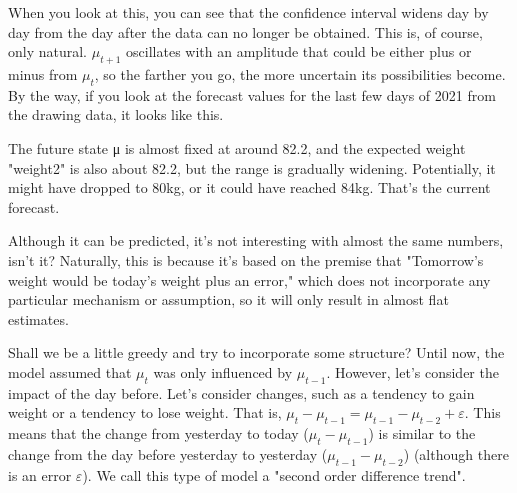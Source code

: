 \documentclass{ltjsbook}
\begin{document}
When you look at this, you can see that the confidence interval widens day by day from the day after the data can no longer be obtained. This is, of course, only natural. $\mu_{t+1}$ oscillates with an amplitude that could be either plus or minus from $\mu_t$, so the farther you go, the more uncertain its possibilities become. By the way, if you look at the forecast values for the last few days of 2021 from the drawing data, it looks like this.

The future state μ is almost fixed at around 82.2, and the expected weight "weight2" is also about 82.2, but the range is gradually widening. Potentially, it might have dropped to 80kg, or it could have reached 84kg. That's the current forecast.

Although it can be predicted, it's not interesting with almost the same numbers, isn't it? Naturally, this is because it's based on the premise that "Tomorrow's weight would be today's weight plus an error," which does not incorporate any particular mechanism or assumption, so it will only result in almost flat estimates.

Shall we be a little greedy and try to incorporate some structure?
Until now, the model assumed that $\mu_t$ was only influenced by $\mu_{t-1}$. However, let's consider the impact of the day before.
Let's consider changes, such as a tendency to gain weight or a tendency to lose weight. That is, $\mu_t - \mu_{t-1} = \mu_{t-1}-\mu_{t-2}+\varepsilon$. This means that the change from yesterday to today ($\mu_t - \mu_{t-1}$) is similar to the change from the day before yesterday to yesterday ($\mu_{t-1}-\mu_{t-2}$) (although there is an error $\varepsilon$). We call this type of model a "second order difference trend".
\end{document}
